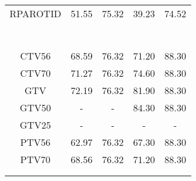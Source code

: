 \begin{sidewaystable}[p]
{\begin{tabular}{ccccc}
RPAROTID & 51.55 & 75.32 & 39.23 & 74.52 \\\\\\\\\\\\\\
 \bottomrule\\
CTV56 & 68.59 & 76.32 & 71.20 & 88.30 \\
CTV70 & 71.27 & 76.32 & 74.60 & 88.30 \\
GTV & 72.19 & 76.32 & 81.90 & 88.30 \\
GTV50 & - & - & 84.30 & 88.30 \\
GTV25 & - & - & - & - \\
PTV56 & 62.97 & 76.32 & 67.30 & 88.30 \\
PTV70 & 68.56 & 76.32 & 71.20 & 88.30 \\\\
 \bottomrule\\
 \end{tabular}
}
\end{sidewaystable}


